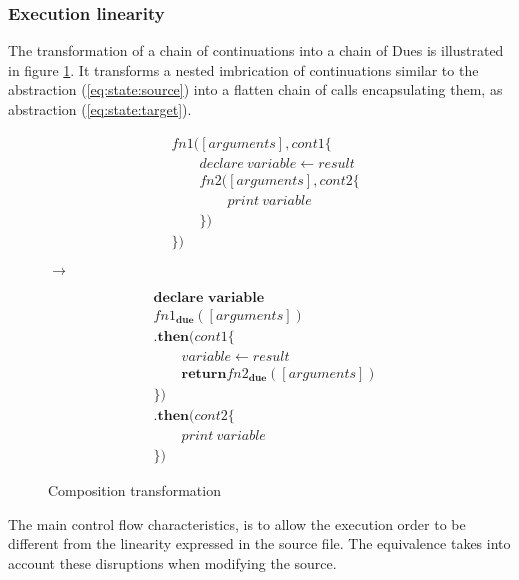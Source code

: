 \subsubsection{Execution linearity}

The transformation of a chain of continuations into a chain of Dues is illustrated in figure \ref{fig:comp-transform}.
It transforms a nested imbrication of continuations similar to the abstraction (\ref{eq:state:source}) into a flatten chain of calls encapsulating them, as abstraction (\ref{eq:state:target}).

\begin{figure}[h!]
  \begin{minipage}{0.40\textwidth}
    \centering
    \begin{align} \label{eq:state:source}
    &fn1([arguments], cont1 \{\nonumber\\
    &\qquad  declare ~ variable \leftarrow result\nonumber\\
    &\qquad  fn2([arguments], cont2 \{\nonumber\\
    &\qquad\qquad    print ~ variable\nonumber\\
    &\qquad  \})\nonumber\\
    &\})
    \end{align}
  \end{minipage}
  \hfill
  $\to$
  \hfill
  \begin{minipage}{0.40\textwidth}
    \centering
    \begin{align} \label{eq:state:target}
    &\textbf{declare variable}\nonumber\\
    &fn1_\textbf{due}([arguments])\nonumber\\
    &\textbf{.then}(cont1\{\nonumber\\
    &\qquad  variable \leftarrow result\nonumber\\
    &\qquad  \textbf{return} fn2_\textbf{due}([arguments])\nonumber\\
    &\})\nonumber\\
    &\textbf{.then}(cont2\{\nonumber\\
    &\qquad  print ~ variable\nonumber\\
    &\})
    \end{align}
  \end{minipage}
  \caption{Composition transformation}
  \label{fig:comp-transform}
\end{figure}

The main control flow characteristics, is to allow the execution order to be different from the linearity expressed in the source file.
The equivalence takes into account these disruptions when modifying the source.


